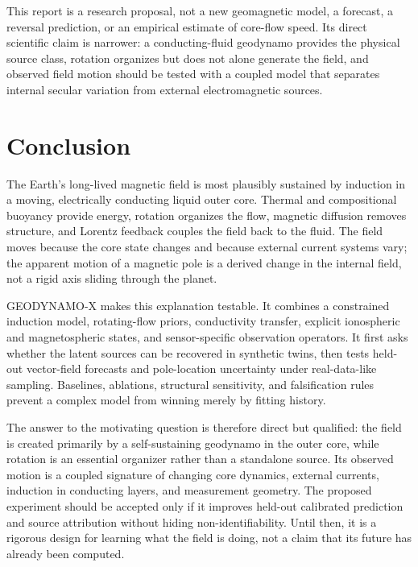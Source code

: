 \documentclass[conference]{IEEEtran}
\begin{document}
This report is a research proposal, not a new geomagnetic model, a forecast, a reversal prediction, or an empirical estimate of core-flow speed. Its direct scientific claim is narrower: a conducting-fluid geodynamo provides the physical source class, rotation organizes but does not alone generate the field, and observed field motion should be tested with a coupled model that separates internal secular variation from external electromagnetic sources.

\section{Conclusion}
The Earth's long-lived magnetic field is most plausibly sustained by induction in a moving, electrically conducting liquid outer core. Thermal and compositional buoyancy provide energy, rotation organizes the flow, magnetic diffusion removes structure, and Lorentz feedback couples the field back to the fluid. The field moves because the core state changes and because external current systems vary; the apparent motion of a magnetic pole is a derived change in the internal field, not a rigid axis sliding through the planet.

GEODYNAMO-X makes this explanation testable. It combines a constrained induction model, rotating-flow priors, conductivity transfer, explicit ionospheric and magnetospheric states, and sensor-specific observation operators. It first asks whether the latent sources can be recovered in synthetic twins, then tests held-out vector-field forecasts and pole-location uncertainty under real-data-like sampling. Baselines, ablations, structural sensitivity, and falsification rules prevent a complex model from winning merely by fitting history.

The answer to the motivating question is therefore direct but qualified: the field is created primarily by a self-sustaining geodynamo in the outer core, while rotation is an essential organizer rather than a standalone source. Its observed motion is a coupled signature of changing core dynamics, external currents, induction in conducting layers, and measurement geometry. The proposed experiment should be accepted only if it improves held-out calibrated prediction and source attribution without hiding non-identifiability. Until then, it is a rigorous design for learning what the field is doing, not a claim that its future has already been computed.
\end{document}
